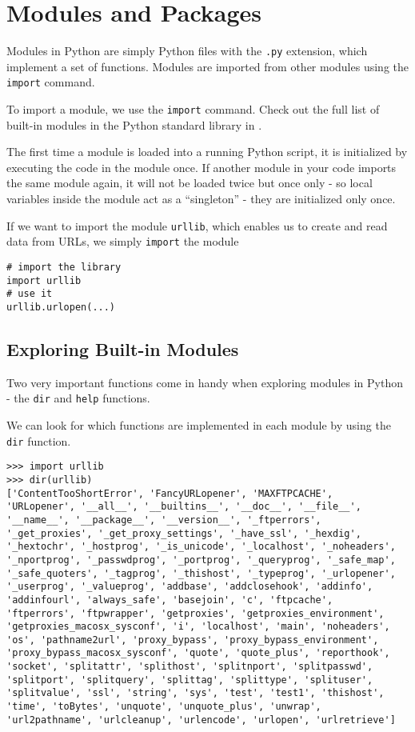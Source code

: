 \documentclass[a4paper,oneside]{book}
\numberwithin{equation}{chapter}
\begin{document}
\section{Modules and Packages}
Modules in Python are simply Python files with the \texttt{.py} extension, which implement a set of functions. Modules are imported from other modules using the \texttt{import} command.

To import a module, we use the \texttt{import} command. Check out the full list of built-in modules in the Python standard library in \cite{3}.

The first time a module is loaded into a running Python script, it is initialized by executing the code in the module once. If another module in your code imports the same module again, it will not be loaded twice but once only - so local variables inside the module act as a ``singleton'' - they are initialized only once.

If we want to import the module \texttt{urllib}, which enables us to create and read data from URLs, we simply \texttt{import} the module
\begin{verbatim}
# import the library
import urllib
# use it
urllib.urlopen(...)
\end{verbatim}
\subsection{Exploring Built-in Modules}
Two very important functions come in handy when exploring modules in Python - the \texttt{dir} and \texttt{help} functions.

We can look for which functions are implemented in each module by using the \texttt{dir} function.
\begin{verbatim}
>>> import urllib
>>> dir(urllib)
['ContentTooShortError', 'FancyURLopener', 'MAXFTPCACHE',
'URLopener', '__all__', '__builtins__', '__doc__', '__file__',
'__name__', '__package__', '__version__', '_ftperrors',
'_get_proxies', '_get_proxy_settings', '_have_ssl', '_hexdig',
'_hextochr', '_hostprog', '_is_unicode', '_localhost', '_noheaders',
'_nportprog', '_passwdprog', '_portprog', '_queryprog', '_safe_map',
'_safe_quoters', '_tagprog', '_thishost', '_typeprog', '_urlopener',
'_userprog', '_valueprog', 'addbase', 'addclosehook', 'addinfo',
'addinfourl', 'always_safe', 'basejoin', 'c', 'ftpcache',
'ftperrors', 'ftpwrapper', 'getproxies', 'getproxies_environment',
'getproxies_macosx_sysconf', 'i', 'localhost', 'main', 'noheaders',
'os', 'pathname2url', 'proxy_bypass', 'proxy_bypass_environment',
'proxy_bypass_macosx_sysconf', 'quote', 'quote_plus', 'reporthook',
'socket', 'splitattr', 'splithost', 'splitnport', 'splitpasswd',
'splitport', 'splitquery', 'splittag', 'splittype', 'splituser',
'splitvalue', 'ssl', 'string', 'sys', 'test', 'test1', 'thishost',
'time', 'toBytes', 'unquote', 'unquote_plus', 'unwrap',
'url2pathname', 'urlcleanup', 'urlencode', 'urlopen', 'urlretrieve']
\end{verbatim}
\end{document}
